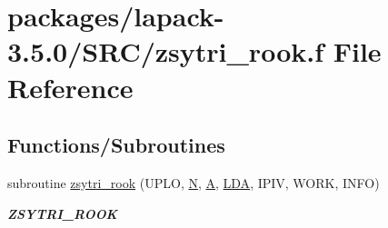 \hypertarget{zsytri__rook_8f}{}\section{packages/lapack-\/3.5.0/\+S\+R\+C/zsytri\+\_\+rook.f File Reference}
\label{zsytri__rook_8f}
\subsection*{Functions/\+Subroutines}
\begin{DoxyCompactItemize}
\item 
subroutine \hyperlink{group__complex16SYcomputational_ga8962328f63b2ca765a097ba8b8e448ac}{zsytri\+\_\+rook} (U\+P\+L\+O, \hyperlink{polmisc_8c_a0240ac851181b84ac374872dc5434ee4}{N}, \hyperlink{classA}{A}, \hyperlink{example__user_8c_ae946da542ce0db94dced19b2ecefd1aa}{L\+D\+A}, I\+P\+I\+V, W\+O\+R\+K, I\+N\+F\+O)
\begin{DoxyCompactList}\small\item\em {\bfseries Z\+S\+Y\+T\+R\+I\+\_\+\+R\+O\+O\+K} \end{DoxyCompactList}\end{DoxyCompactItemize}
